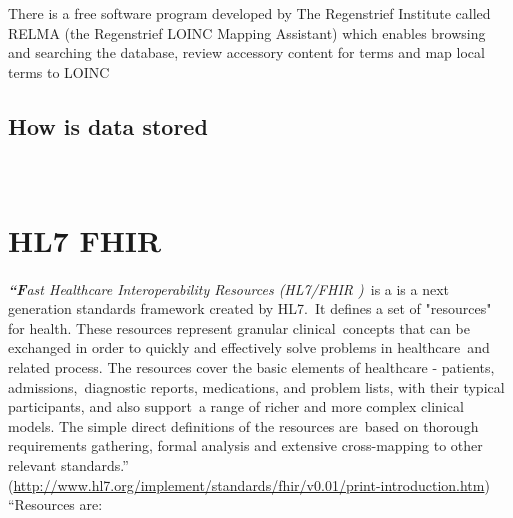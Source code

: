 \documentclass[DIV=calc, paper=a4, fontsize=12pt, onecolumn]{scrartcl}	 %
\newcommand{\initial}[1]{ %
\lettrine[lines=3,lhang=0.3,nindent=0em,slope=0em]{
\color{DarkBlue}
{\textbf{\textit{#1}}}}{}}
\begin{document}
There is a free software program developed by The Regenstrief Institute called RELMA (the Regenstrief LOINC Mapping Assistant) which enables browsing and searching the database, review accessory content for terms and map local terms to LOINC \citep{kroth_using_2012} 

\subsection{How is data stored}\


\section[Fast Healthcare Interoperability Resources (HL7 FHIR\textsuperscript{\texttrademark})]
{HL7 FHIR \textsuperscript{\texttrademark}}
  \label{sec:fhir}

\initial{``F}\textit{ast Healthcare Interoperability Resources (HL7/FHIR )}\
is a is a next generation standards framework created by HL7.\
It defines a set of "resources" for health. These resources represent granular clinical\
concepts that can be exchanged in order to quickly and effectively solve problems in healthcare\
 and related process. The resources cover the basic elements of healthcare - patients, admissions,\
diagnostic reports, medications, and problem lists, with their typical participants, and also support\
a range of richer and more complex clinical models. The simple direct definitions of the resources are\
 based on thorough requirements gathering, formal analysis and extensive cross-mapping to other relevant standards.''\\
  (\url{http://www.hl7.org/implement/standards/fhir/v0.01/print-introduction.htm})\\

``Resources are:\
\end{document}
